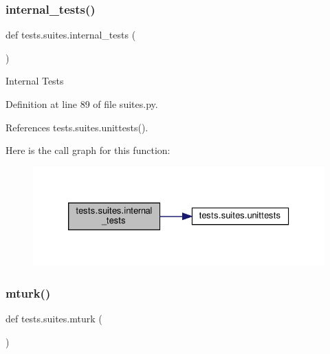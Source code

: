 \mbox{\label{namespacetests_1_1suites_aaa84dd961fb392c540b3a116119be21c}} 
\subsubsection{\texorpdfstring{internal\+\_\+tests()}{internal\_tests()}}
{\footnotesize\ttfamily def tests.\+suites.\+internal\+\_\+tests (\begin{DoxyParamCaption}{ }\end{DoxyParamCaption})}

\begin{DoxyVerb}Internal Tests\end{DoxyVerb}
 

Definition at line 89 of file suites.\+py.



References tests.\+suites.\+unittests().

Here is the call graph for this function\+:
\nopagebreak
\begin{figure}[H]
\begin{center}
\leavevmode
\includegraphics[width=326pt]{namespacetests_1_1suites_aaa84dd961fb392c540b3a116119be21c_cgraph}
\end{center}
\end{figure}
\mbox{\label{namespacetests_1_1suites_a5d5a0bb14f72dd9c86a97cc6ca6add87}} 
\subsubsection{\texorpdfstring{mturk()}{mturk()}}
{\footnotesize\ttfamily def tests.\+suites.\+mturk (\begin{DoxyParamCaption}{ }\end{DoxyParamCaption})}


